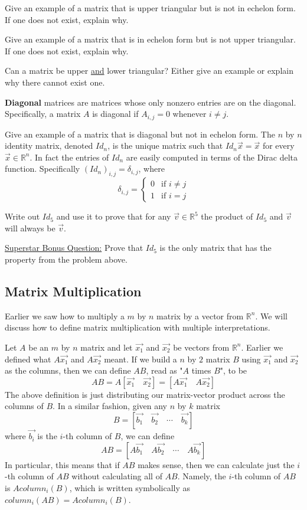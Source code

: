 \bq Give an example of a matrix that is upper triangular but is not in echelon form. If one does not exist, explain why.
\eq

\bq Give an example of a matrix that is in echelon form but is not upper triangular. If one does not exist, explain why.
\eq

\bq Can a matrix be upper \underline{and} lower triangular? Either give an example or explain why there cannot exist one.
\eq

\textbf{Diagonal} matrices are matrices whose only nonzero entries are on the diagonal. Specifically, a matrix $A$ is diagonal if $A_{i,j}=0$ whenever $i \neq j$.

\bq Give an example of a matrix that is diagonal but not in echelon form.
\eq
The $n$ by $n$ identity matrix, denoted $Id_n$, is the unique matrix such that $Id_n \vec{x}= \vec{x}$ for every $\vec{x} \in \mathbb{R}^n$. In fact the entries of $Id_n$ are easily computed in terms of the Dirac delta function. Specifically $(Id_n)_{i,j}=\delta_{i,j}$, where $$\delta_{i,j}=\left\{ \begin{array}{cc} 0 & \mbox{if }i\neq j\\ 1 & \mbox{if } i = j \end{array} \right. $$

\bq Write out $Id_5$ and use it to prove that for any $\vec{v} \in \mathbb{R}^5$ the product of $Id_5$ and $\vec{v}$ will always be $\vec{v}$.
\eq

\bq \underline{Superstar Bonus Question:} Prove that $Id_5$ is the only matrix that has the property from the problem above.
\begin{annotation}
\end{annotation}
\eq

\subsection{Matrix Multiplication}
Earlier we saw how to multiply a $m$ by $n$ matrix by a vector from $\mathbb{R}^n$. We will discuss how to define matrix multiplication with multiple interpretations.

Let $A$ be an $m$ by $n$ matrix and let $\vec{x_1}$ and $\vec{x_2}$ be vectors from $\mathbb{R}^n$. Earlier we defined what $A\vec{x_1}$ and $A\vec{x_2}$ meant. If we build a $n$ by $2$ matrix $B$ using $\vec{x_1}$ and $\vec{x_2}$ as the columns, then we can define $AB$, read as "$A$ times $B$", to be $$AB=A [\vec{x_1} \quad \vec{x_2}]=[A\vec{x_1} \quad A\vec{x_2}]$$
The above definition is just distributing our matrix-vector product across the columns of $B$. In a similar fashion, given any $n$ by $k$ matrix $$B=[\vec{b_1} \quad  \vec{b_2}  \quad \cdots \quad  \vec{b_k}]$$
where $\vec{b_i}$ is the $i$-th column of $B$, we can define
$$AB=[A\vec{b_1}  \quad A\vec{b_2}  \quad \cdots  \quad A\vec{b_k}]$$
In particular, this means that if $AB$ makes sense, then we can calculate just the $i$-th column of $AB$ without calculating all of $AB$. Namely, the $i$-th column of $AB$ is $A column_i(B)$, which is written symbolically as $column_i(AB)=A column_i(B)$.

